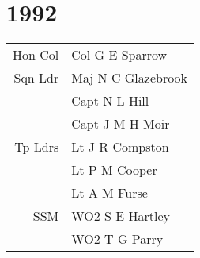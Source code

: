 \chapter*{1992}

\begin{center}
  \small
  \begin{tabular}{rl}
    Hon Col & Col G E Sparrow \\
    Sqn Ldr & Maj N C Glazebrook \\
      & Capt N L Hill \\
      & Capt J M H Moir \\
    Tp Ldrs & Lt J R Compston \\
      & Lt P M Cooper \\
      & Lt A M Furse \\
    SSM & WO2 S E Hartley \\
      & WO2 T G Parry \\
  \end{tabular}
\end{center}

